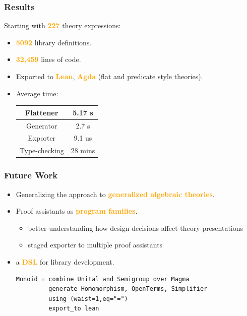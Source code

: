 \documentclass[t,10pt,numbers,fleqn,usenames,xcolor=dvipsnames]{beamer}
\begin{document}
\begin{frame}[fragile] 
\frametitle{Results}
Starting with \textbf{\textcolor{Orange}{227}} theory expressions:
\begin{itemize}
\item \textcolor{Orange}{\textbf{5092}} library definitions. 
\item \textcolor{Orange}{\textbf{32,459}} lines of code. 
\item Exported to \textcolor{Orange}{\textbf{Lean}}, \textcolor{Orange}{\textbf{Agda}} (flat and predicate style theories).
\pause
\item Average time: \\ \vspace{0.25cm}
\begin{center}
\begin{adjustbox}{width=0.4\columnwidth}
\begin{tabular}{| c | c |}\hline
Flattener & 5.17 s \\ \hline
Generator & 2.7 s \\ \hline
Exporter & 9.1 us \\ \hline
Type-checking & 28 mins \\ \hline
\end{tabular}
\end{adjustbox}
\end{center}
\end{itemize}
\end{frame}

\begin{frame}[fragile] 
\frametitle{Future Work}
\begin{itemize}
\item Generalizing the approach to \textcolor{Orange}{\textbf{generalized algebraic theories}}.

\vspace{0.5cm}
\item Proof assistants as \textcolor{Orange}{\textbf{program families}}. 
\begin{itemize}
\item better understanding how design decisions affect theory presentations 
\item staged exporter to multiple proof assistants 
\end{itemize}

\vspace{0.5cm}
\item a \textcolor{Orange}{\textbf{DSL}} for library development. 
\vspace{0.2cm}
\begin{verbatim}
Monoid = combine Unital and Semigroup over Magma
         generate Homomorphism, OpenTerms, Simplifier
         using (waist=1,eq="=")
         export_to lean
\end{verbatim}
\end{itemize}
\end{frame} 
\end{document}
